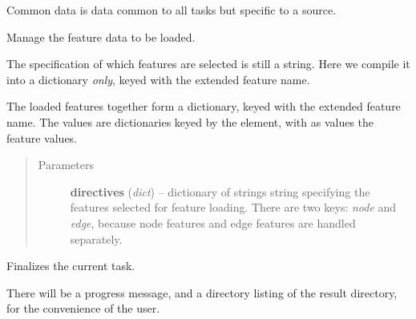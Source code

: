 \documentclass[letterpaper,10pt,english]{sphinxmanual}
\begin{document}
\begin{fulllineitems}
\begin{fulllineitems}
Common data is data  common to all tasks but specific to a source.

\end{fulllineitems}


\begin{fulllineitems}
\label{graf/graf:graf.task.GrafTask.compile}
\end{fulllineitems}


\begin{fulllineitems}
\label{graf/graf:graf.task.GrafTask.feature_loader}
Manage the feature data to be loaded.

The specification of which features are selected is still a string.
Here we compile it into a dictionary \emph{only}, keyed with the extended feature name.

The loaded features together form a dictionary, keyed with the extended feature name.
The values are dictionaries keyed by the element, with as values the feature values.
\begin{quote}\begin{description}
\item[{Parameters}] \leavevmode
\textbf{directives} (\emph{dict}) --
dictionary of strings string specifying the features selected for feature loading.
There are two keys: \emph{node} and \emph{edge}, because node features and edge features are handled separately.

\end{description}\end{quote}

\end{fulllineitems}


\begin{fulllineitems}
\label{graf/graf:graf.task.GrafTask.finish_task}
Finalizes the current task.

There will be a progress message, and a directory listing of the result directory,
for the convenience of the user.

\end{fulllineitems}



\end{fulllineitems}
\end{document}

